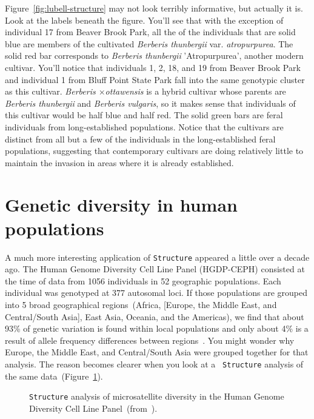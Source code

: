 \documentclass[12pt]{article}
\begin{document}
Figure~\ref{fig:lubell-structure} may not look terribly informative,
but actually it is. Look at the labels beneath the figure. You'll see
that with the exception of individual 17 from Beaver Brook Park, all
the of the individuals that are solid blue are members of the
cultivated {\it Berberis thunbergii\/} var. {\it atropurpurea}. The
solid red bar corresponds to {\it Berberis thunbergii\/}
'Atropurpurea', another modern cultivar. You'll notice that
individuals 1, 2, 18, and 19 from Beaver Brook Park and individual 1
from Bluff Point State Park fall into the same genotypic cluster as
this cultivar. {\it Berberis $\times$ottawensis} is a hybrid cultivar
whose parents are {\it Berberis thunbergii\/} and {\it Berberis
  vulgaris\/}, so it makes sense that individuals of this cultivar
would be half blue and half red. The solid green bars are feral
individuals from long-established populations. Notice that the
cultivars are distinct from all but a few of the individuals in the
long-established feral populations, suggesting that contemporary
cultivars are doing relatively little to maintain the invasion in
areas where it is already established.

\section*{Genetic diversity in human populations}

A much more interesting application of {\tt Structure} appeared a
little over a decade ago. The Human Genome Diversity Cell Line Panel
(HGDP-CEPH) consisted at the time of data from 1056
individuals in 52 geographic populations. Each individual was
genotyped at 377 autosomal loci. If those populations are grouped into
5 broad geographical regions~(Africa, [Europe, the Middle East, and
Central/South Asia], East Asia, Oceania, and the Americas), we find
that about 93\% of genetic variation is found within local populations
and only about 4\% is a result of allele frequency differences between
regions~\cite{Rosenberg-etal-2002}. You might wonder why Europe, the
Middle East, and Central/South Asia were grouped together for that
analysis. The reason becomes clearer when you look at a {\tt
  Structure} analysis of the same data~(Figure~\ref{fig:HGDP-CEPH}).

\begin{figure}
\caption{{\tt Structure} analysis of microsatellite diversity in the
  Human Genome Diversity Cell Line
  Panel~(from~\cite{Rosenberg-etal-2002}).}\label{fig:HGDP-CEPH} 
\end{figure}
\end{document}
